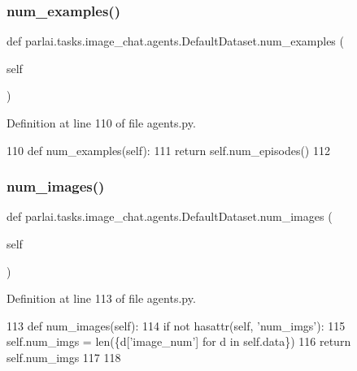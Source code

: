 \subsubsection{\texorpdfstring{num\+\_\+examples()}{num\_examples()}}
{\footnotesize\ttfamily def parlai.\+tasks.\+image\+\_\+chat.\+agents.\+Default\+Dataset.\+num\+\_\+examples (\begin{DoxyParamCaption}\item[{}]{self }\end{DoxyParamCaption})}



Definition at line 110 of file agents.\+py.


\begin{DoxyCode}
110     \textcolor{keyword}{def }num\_examples(self):
111         \textcolor{keywordflow}{return} self.num\_episodes()
112 
\end{DoxyCode}
\mbox{\label{classparlai_1_1tasks_1_1image__chat_1_1agents_1_1DefaultDataset_aa926ef2ab5deb252b7ee8b6023c8ae7b}} 
\subsubsection{\texorpdfstring{num\+\_\+images()}{num\_images()}}
{\footnotesize\ttfamily def parlai.\+tasks.\+image\+\_\+chat.\+agents.\+Default\+Dataset.\+num\+\_\+images (\begin{DoxyParamCaption}\item[{}]{self }\end{DoxyParamCaption})}



Definition at line 113 of file agents.\+py.


\begin{DoxyCode}
113     \textcolor{keyword}{def }num\_images(self):
114         \textcolor{keywordflow}{if} \textcolor{keywordflow}{not} hasattr(self, \textcolor{stringliteral}{'num\_imgs'}):
115             self.num\_imgs = len(\{d[\textcolor{stringliteral}{'image\_num'}] \textcolor{keywordflow}{for} d \textcolor{keywordflow}{in} self.data\})
116         \textcolor{keywordflow}{return} self.num\_imgs
117 
118 
\end{DoxyCode}


